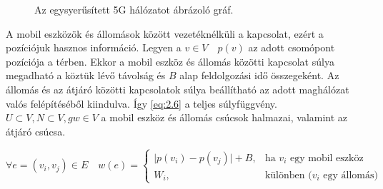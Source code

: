 \documentclass[a4paper,oneside]{article}
\begin{document}
\usetikzlibrary{arrows.meta}
\begin{figure}[h]
  \centering
  \caption{Az egysyerűsített 5G hálózatot ábrázoló gráf.} \label{fig:2.1}
\end{figure}

A mobil eszközök és állomások között vezetéknélküli a kapcsolat,
ezért a pozíciójuk hasznos információ.
Legyen a $v \in V \quad p(v)$ az adott csomópont pozíciója a térben.
Ekkor a mobil eszköz és állomás közötti kapcsolat súlya megadható a köztük lévő távolság
és $B$ alap feldolgozási idő összegeként.
Az állomás és az átjáró közötti kapcsolatok súlya beállítható az adott maghálózat valós felépítéséből kiindulva.
Így \eqref{eq:2.6} a teljes súlyfüggvény.
$U \subset V, N \subset V, gw \in V$ a mobil eszköz és állomás csúcsok halmazai, valamint az átjáró csúcsa.

\begin{equation}
  \forall e = (v_i, v_j) \in E \quad w(e) = \begin{cases}
    \vert p(v_i) - p(v_j) \vert + B, & \text{ha $v_i$ egy mobil eszköz} \\
    W_i, & \text{különben ($v_i$ egy állomás)}
  \end{cases} \label{eq:2.6}
\end{equation}
\end{document}
